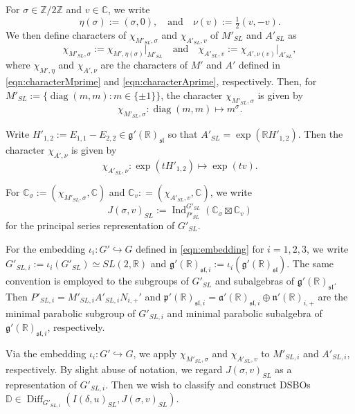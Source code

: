 \documentclass[a4paper,11pt,reqno]{amsart}
\newcommand{\fraka}{\mathfrak{a}}
\newcommand{\frakg}{\mathfrak{g}}
\newcommand{\frakn}{\mathfrak{n}}
\newcommand{\frakp}{\mathfrak{p}}
\newcommand{\DD}{\mathbb{D}}
\newcommand{\0}{{\bf 0}}
\newcommand{\Z}{\mathbb{Z}}
\newcommand{\R}{\mathbb{R}}
\newcommand{\C}{\mathbb{C}}
\newcommand{\1}{{\bf 1}}
\DeclareMathOperator{\Ind}{Ind}
\DeclareMathOperator{\diag}{diag}
\DeclareMathOperator{\Diff}{Diff}
\newcommand{\fraksl}{{\mathfrak{sl}}}
\theoremstyle{plain}
\theoremstyle{definition}
\numberwithin{equation}{section}
\theoremstyle{definition}
\begin{document}
For $\sigma \in \Z/2\Z$ and $v \in \C$, we write
\begin{equation*}
\eta(\sigma):=(\sigma,0),
\quad
\text{and}
\quad
\nu(v):=\tfrac{1}{2}(v,-v).
\end{equation*}
We then define characters of $\chi_{M'_{SL},\sigma}$ and $\chi_{A'_{SL},v}$
of $M'_{SL}$ and $A'_{SL}$ as
\begin{equation*}
\chi_{M'_{SL},\sigma}:=\chi_{M',\eta(\sigma)}\vert_{M'_{SL}}
\quad
\text{and}
\quad
\chi_{A'_{SL},v}:=\chi_{A',\nu(v)}\vert_{A'_{SL}},
\end{equation*}
where $\chi_{M',\eta}$ and $\chi_{A',\nu}$ are the characters of 
$M'$ and $A'$ defined in \eqref{eqn:characterMprime} and 
\eqref{eqn:characterAprime}, respectively.
Then, for $M'_{SL}:=\{\diag(m,m):m \in \{\pm 1 \} \}$, the character 
$\chi_{M'_{SL},\sigma}$ is given by
\begin{equation}\label{eqn:charSLMprime}
\chi_{M'_{SL},\sigma}\colon \diag(m,m)\mapsto m^\sigma.
\end{equation}

Write $H'_{1,2}:=E_{1,1}-E_{2,2} \in \frakg'(\R)_{\fraksl}$ so that 
$A'_{SL}=\exp(\R H'_{1,2})$. Then the character
$\chi_{A',\nu}$ is given by
\begin{equation}\label{eqn:charSLAprime}
\chi_{A'_{SL},\nu}\colon 
\exp(tH'_{1,2})\mapsto \exp(tv).
\end{equation}

For 
$\C_\sigma:=(\chi_{M'_{SL},\sigma},\C)$
and
$\C_v: =(\chi_{A'_{SL}, v},\C)$,
we write 
\begin{equation*}
J(\sigma, v)_{SL}:=\Ind_{P'_{SL}}^{G'_{SL}}(\C_{\sigma}\boxtimes \C_v)
\end{equation*}
for the principal series representation of $G'_{SL}$.

For the embedding 
$\iota_i\colon G' \hookrightarrow G$ 
defined in \eqref{eqn:embedding} for $i=1,2,3$, 
we write $G'_{SL,i} :=\iota_i(G'_{SL})\simeq SL(2,\R)$
and $\frakg'(\R)_{\fraksl,i}:=\iota_i(\frakg'(\R)_{\fraksl})$.
The same convention is employed to the subgroups of $G'_{SL}$
and subalgebras of $\frakg'(\R)_{\fraksl}$.
Then $P'_{SL,i}=M'_{SL,i}A'_{SL,i}N_{i,+}'$ and 
$\frakp'(\R)_{\fraksl,i} =\fraka'(\R)_{\fraksl,i} \oplus \frakn'(\R)_{i,+}$
are the minimal parabolic subgroup of $G'_{SL,i}$
and minimal parabolic subalgebra of $\frakg'(\R)_{\fraksl,i}$,
respectively.

Via the embedding $\iota_i\colon G' \hookrightarrow G$, 
we apply $\chi_{M'_{SL},\sigma}$ and $\chi_{A'_{SL},v}$
to $M'_{SL,i}$ and $A'_{SL,i}$, respectively.
By slight abuse of notation, we regard $J(\sigma, v)_{SL}$ as 
a representation of $G'_{SL,i}$.
Then we wish to classify and construct DSBOs
$\DD \in \Diff_{G'_{SL,i}}(I(\delta,u)_{SL}, J(\sigma,v)_{SL})$.
\end{document}
